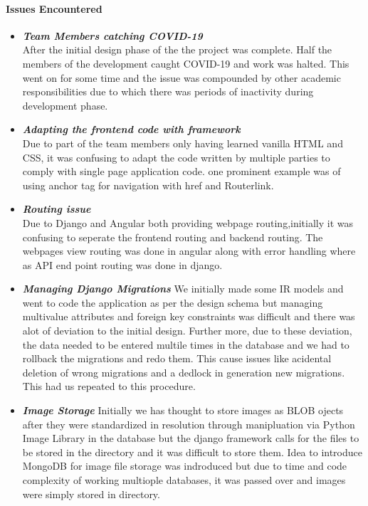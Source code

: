 \documentclass[12pt]{article}
\begin{document}
\paragraph{Issues Encountered}
\begin{itemize}
    \item \textit{\textbf{Team Members catching COVID-19}}\\
        After the initial design phase of the the project was complete. Half the members of the development caught COVID-19 and work was halted. This went on for some time and the issue was compounded by other academic responsibilities due to which there was periods of inactivity during development phase.
    \item \textit{\textbf{Adapting the frontend code with framework}}\\
        Due to part of the team members only having learned vanilla HTML and CSS, it was confusing to adapt the code written by multiple parties to comply with single page application code. 
        one prominent example was of using anchor tag for navigation with href and Routerlink.
    \item \textit{\textbf{Routing issue}}\\
        Due to Django and Angular both providing webpage routing,initially it was confusing to seperate the frontend routing and backend routing. The webpages view routing was done in angular along with error handling where as API end point routing was done in django.
    \item  \textit{\textbf{Managing Django Migrations}}
        We initially made some IR models and went to code the application as per the design schema but managing multivalue attributes and foreign key constraints was difficult and there was alot of deviation to the initial design. Further more, due to these deviation, the data needed to be entered multile times in the database and we had to rollback the migrations and redo them. This cause issues like acidental deletion of wrong migrations and a dedlock in generation new migrations.
        This had us repeated to this procedure.
    \item  \textit{\textbf{Image Storage}}
        Initially we has thought to store images as BLOB ojects after they were standardized in resolution through manipluation via Python Image Library in the database but the django framework calls for the files to be stored in the directory and it was difficult to store them. Idea to introduce MongoDB for image file storage was indroduced but due to time and code complexity of working multiople databases, it was passed over and images were simply stored in directory.

\end{itemize}
\end{document}
